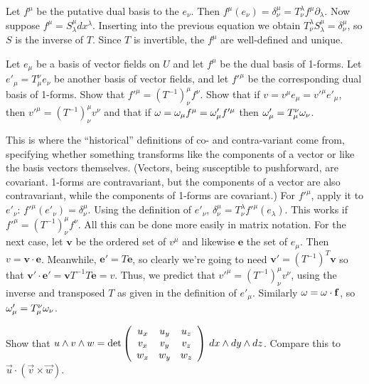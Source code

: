 {Let $f^\mu$ be the putative dual basis to the $e_\nu$. Then $f^\mu(e_\nu)=\delta^\mu_\nu=T^\lambda_\nu f^\mu\partial_\lambda$.
Now suppose $f^\mu=S^\mu_\lambda dx^\lambda$. Inserting into the previous equation we obtain $T^\lambda_\nu S^\mu_\lambda=\delta^\mu_\nu$, so $S$ is the inverse of $T$. Since $T$ is invertible, the $f^\mu$ are well-defined and unique.

\begin{p}{Let $e_\mu$ be a basis of vector fields on $U$ and let $f^\mu$ be the dual basis of 1-forms. Let $e'_\mu=T^\nu_\mu e_\nu$
be another basis of vector fields, and let $f'^\mu$ be the corresponding dual basis of 1-forms. Show that $f'^\mu=(T^{-1})^\mu_\nu f^\nu$. Show
that if $v=v^\mu e_\mu=v'^\mu e'_\mu$, then $v'^\mu=(T^{-1})^\mu_\nu v^\nu$ and that if
$\omega=\omega_\mu f^\mu=\omega'_\mu f'^\mu$ then $\omega'_\mu=T^\nu_\mu \omega_\nu$.}
\end{p}

This is where the ``historical'' definitions of co- and contra-variant come from, specifying whether something transforms like the components
of a vector or like the basis vectors themselves. (Vectors, being susceptible to pushforward, are covariant. 1-forms are contravariant, but the components of a vector are also contravariant, while the components of 1-forms are covariant.) For $f'^\mu$, apply it to $e'_\nu$:
$f'^\mu(e'_\nu)=\delta^\mu_\nu$. Using the definition of $e'_\nu$, $\delta^\mu_\nu=T_\nu^\lambda f'^\mu(e_\lambda)$. 
This works if $f'^\mu=(T^{-1})^\mu_\nu f^\nu$. All this can be done more easily in matrix notation. For the next case, let $\mathbf{v}$ be the 
ordered set of $v^\mu$ and likewise $\mathbf{e}$ the set of $e_\mu$. Then $v=\mathbf{v}\cdot\mathbf{e}$. Meanwhile, $\mathbf{e}'=T\mathbf{e}$, so clearly we're going to need $\mathbf{v}'=(T^{-1})^T\mathbf{v}$ so that 
$\mathbf{v}'\cdot\mathbf{e}'=\mathbf{v}T^{-1}T\mathbf{e}=v$. Thus, we predict that $v'^\mu=(T^{-1})^\mu_\nu v^\nu$, using
the inverse and transposed $T$ as given in the definition of $e'_\mu$. Similarly $\omega=\mathbf{\omega}\cdot\mathbf{f}$, so 
$\omega'_\mu=T^\nu_\mu \omega_\nu$.

\begin{p}{Show that $u\wedge v\wedge w={\rm det}\left(\begin{array}{ccc} u_x & u_y & u_z \\
v_x & v_y & v_z\\ w_x & w_y & w_z\end{array}\right)\,dx\wedge dy\wedge dz$. Compare this to $\vec{u}\cdot(\vec{v}\times\vec{w})$.}
\end{p}

}

